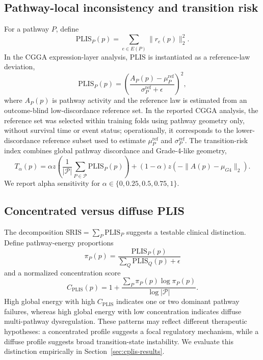 \documentclass[conference]{IEEEtran}
\begin{document}
\subsection{Pathway-local inconsistency and transition risk}
For a pathway $P$, define
\begin{equation}
\mathrm{PLIS}_{P}(p)=\sum_{e\in E(P)}\|r_e(p)\|_2^2.
\end{equation}
In the CGGA expression-layer analysis, PLIS is instantiated as a reference-law deviation,
\begin{equation}
\mathrm{PLIS}_{P}(p)=\left(\frac{A_P(p)-\mu_P^{\mathrm{ref}}}{\sigma_P^{\mathrm{ref}}+\epsilon}\right)^2,
\end{equation}
where $A_P(p)$ is pathway activity and the reference law is estimated from an outcome-blind low-discordance reference set. In the reported CGGA analysis, the reference set was selected within training folds using pathway geometry only, without survival time or event status; operationally, it corresponds to the lower-discordance reference subset used to estimate $\mu_P^{\mathrm{ref}}$ and $\sigma_P^{\mathrm{ref}}$. The transition-risk index combines global pathway discordance and Grade-4-like geometry,
\begin{equation}
T_\alpha(p)=\alpha z\left(\frac{1}{|\mathcal P|}\sum_{P\in\mathcal P}\mathrm{PLIS}_P(p)\right)+(1-\alpha)z(-\|A(p)-\mu_{G4}\|_2).
\end{equation}
We report alpha sensitivity for $\alpha\in\{0,0.25,0.5,0.75,1\}$.


\subsection{Concentrated versus diffuse PLIS}
The decomposition $\mathrm{SRIS}=\sum_P\mathrm{PLIS}_P$ suggests a testable clinical distinction. Define pathway-energy proportions
\begin{equation}
\pi_P(p)=\frac{\mathrm{PLIS}_P(p)}{\sum_Q\mathrm{PLIS}_Q(p)+\epsilon}
\end{equation}
and a normalized concentration score
\begin{equation}
C_{\mathrm{PLIS}}(p)=1+\frac{\sum_P \pi_P(p)\log \pi_P(p)}{\log |\mathcal P|}.
\end{equation}
High global energy with high $C_{\mathrm{PLIS}}$ indicates one or two dominant pathway failures, whereas high global energy with low concentration indicates diffuse multi-pathway dysregulation. These patterns may reflect different therapeutic hypotheses: a concentrated profile suggests a focal regulatory mechanism, while a diffuse profile suggests broad transition-state instability. We evaluate this distinction empirically in Section~\ref{sec:cplis-results}.
\end{document}
